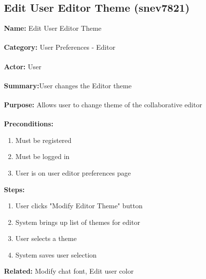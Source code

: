 \documentclass[11pt]{report}
\begin{document}
\subsection{Edit User Editor Theme (snev7821)}
\begin{framed}
	\noindent\textbf{Name:} Edit User Editor Theme \\ \\
	\textbf{Category:} User Preferences - Editor  \\ \\
	\textbf{Actor:} User \\ \\
	\textbf{Summary:}User changes the Editor theme \\ \\
	\textbf{Purpose:} Allows user to change theme of the collaborative editor \\ \\
	\textbf{Preconditions:} 
	\begin{enumerate}
		\item Must be registered
		\item Must be logged in
		\item User is on user editor preferences page
	\end{enumerate}
	\textbf{Steps:}
	\begin{enumerate}
		\item User clicks "Modify Editor Theme" button
		\item System brings up list of themes for editor
		\item User selects a theme
		\item System saves user selection
	\end{enumerate}
	\textbf{Related:} Modify chat font, Edit user color 
\end{framed}

\newpage
\end{document}
